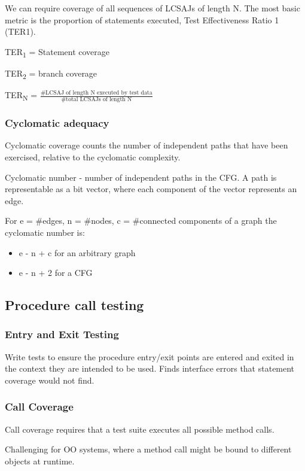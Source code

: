 \documentclass{article}
\begin{document}
We can require coverage of all sequences of LCSAJs of
length N. The most basic metric is the proportion of statements executed, Test Effectiveness Ratio 1 (TER1).

TER\textsubscript{1} = Statement coverage

TER\textsubscript{2} = branch coverage

TER\textsubscript{N} = $\frac{\text{\# LCSAJ of length N executed by test data}}{\text{\# total LCSAJs of length N}}$

\subsubsection{Cyclomatic adequacy}
Cyclomatic coverage counts the number of independent paths that have been exercised, relative to the cyclomatic complexity.

Cyclomatic number - number of independent paths in the CFG. A path is representable as a bit vector, where each component of the vector represents an edge.

For e = \#edges, n = \#nodes, c = \#connected components of a graph the cyclomatic number is:

\begin{itemize}
  \item e - n + c for an arbitrary graph
  \item e - n + 2 for a CFG
\end{itemize}

\subsection{Procedure call testing}
\subsubsection{Entry and Exit Testing}
Write tests to ensure the procedure entry/exit points are entered and exited in the context they are intended to be used. Finds interface errors that statement coverage would not find.

\subsubsection{Call Coverage}
Call coverage requires that a test suite executes all possible method calls.

Challenging for OO systems, where a method call might be bound to different objects at runtime.
\end{document}
